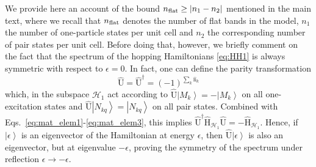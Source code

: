 \documentclass[prl,aps,twocolumn,showpacs,superscriptaddress,longbibliography]{revtex4-1}
\newcommand{\be}{\begin{equation}}
\newcommand{\ee}{\end{equation}}
\newcommand{\mal}{\mathcal}
\newcommand{\lt}{\left(}
\newcommand{\rt}{\right)}
\newcommand{\ran}{\right\rangle}
\newcommand{\abs}[1]{\left| #1 \right|}
\newcommand{\ket}[1]{\left| #1 \ran}
\newcommand{\dar}{\downarrow}
\newcommand{\uar}{\uparrow}
\newcommand{\op}[1]{\mathrm{\hat{#1}}}
\begin{document}
We provide here an account of the bound $n_{\rm flat} \geq \abs{n_1 - n_2}$ mentioned in the main text, where we recall that $n_{\rm flat}$ denotes the number of flat bands in the model, $n_1$ the number of one-particle states per unit cell and $n_2$ the corresponding number of pair states per unit cell. Before doing that, however, we briefly comment on the fact that the spectrum of the hopping Hamiltonians \eqref{eq:HH1} is always symmetric with respect to $\epsilon=0$. In fact, one can define the parity transformation 
\be
	\op{U} = \op{U}^\dag = \lt -1 \rt^{\sum_k \op{n}_k}
\ee
which, in the subspace $\mal{H}_1$ act according to $\op{U} \ket{M_k} = - \ket{M_k}$ on all one-excitation states and $\op{U} \ket{N_{kq}} = \ket{N_{kq}}$ on all pair states. Combined with Eqs.~\eqref{eq:mat_elem1}-\eqref{eq:mat_elem3}, this implies $\op{U}^\dag \op{H}_{\mal{H}_1} \op{U} = - \op{H}_{\mal{H}_1}$. Hence, if $\ket{\epsilon}$ is an eigenvector of the Hamiltonian at energy $\epsilon$, then $\op{U} \ket{\epsilon}$ is also an eigenvector, but at eigenvalue $-\epsilon$, proving the symmetry of the spectrum under reflection $\epsilon \to -\epsilon$. 



\end{document}
